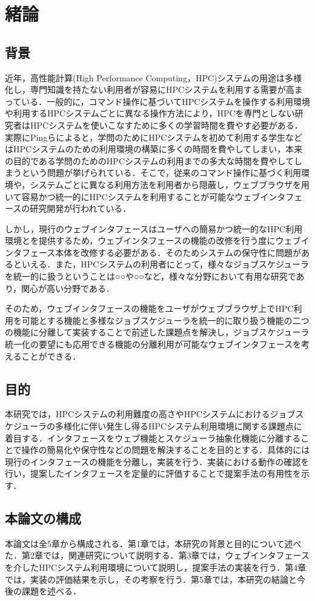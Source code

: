
\section{緒論}
\subsection{背景}
近年，高性能計算(High Performance Computing，HPC)システムの用途は多様化し，専門知識を持たない利用者が容易にHPCシステムを利用する需要が高まっている．一般的に，コマンド操作に基づいてHPCシステムを操作する利用環境や利用するHPCシステムごとに異なる操作方法により，HPCを専門としない研究者はHPCシステムを使いこなすために多くの学習時間を費やす必要がある．実際にPingらによると，学問のためにHPCシステムを初めて利用する学生などはHPCシステムのための利用環境の構築に多くの時間を費やしてしまい，本来の目的である学問のためのHPCシステムの利用までの多大な時間を費やしてしまうという問題が挙げられている．\cite{cite1}そこで，従来のコマンド操作に基づく利用環境や，システムごとに異なる利用方法を利用者から隠蔽し，ウェブブラウザを用いて容易かつ統一的にHPCシステムを利用することが可能なウェブインタフェースの研究開発が行われている．\par
しかし，現行のウェブインタフェースはユーザへの簡易かつ統一的なHPC利用環境とを提供するため，ウェブインタフェースの機能の改修を行う度にウェブインタフェース本体を改修する必要がある．そのためシステムの保守性に問題があるといえる．また，HPCシステムの利用者にとって，様々なジョブスケジューラを統一的に扱うということは○○や○○など，様々な分野において有用な研究であり，関心が高い分野である．\par
そのため，ウェブインタフェースの機能をユーザがウェブブラウザ上でHPC利用を可能とする機能と多様なジョブスケジューラを統一的に取り扱う機能の二つの機能に分離して実装することで前述した課題点を解決し，ジョブスケジューラ統一化の要望にも応用できる機能の分離利用が可能なウェブインタフェースを考えることができる．\par

\subsection{目的}
本研究では，HPCシステムの利用難度の高さやHPCシステムにおけるジョブスケジューラの多様化に伴い発生し得るHPCシステム利用環境に関する課題点に着目する．インタフェースをウェブ機能とスケジューラ抽象化機能に分離することで操作の簡易化や保守性などの問題を解決することを目的とする．具体的には現行のインタフェースの機能を分離し，実装を行う．実装における動作の確認を行い，提案したインタフェースを定量的に評価することで提案手法の有用性を示す．\par

\subsection{本論文の構成}
本論文は全5章から構成される．第1章では，本研究の背景と目的について述べた．第2章では，関連研究について説明する．第3章では，ウェブインタフェースを介したHPCシステム利用環境について説明し，提案手法の実装を行う．第4章では，実装の評価結果を示し，その考察を行う．第5章では，本研究の結論と今後の課題を述べる．\par
